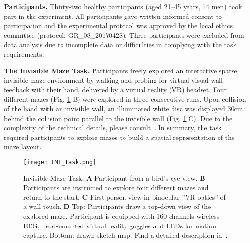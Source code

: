 
\indent \textbf{Participants.} Thirty-two healthy participants (aged 21--45 years, 14 men) took part in the
experiment. All participants gave written informed consent to participation and the experimental protocol was approved by the local ethics committee (protocol: GR\_08\_20170428). Three participants were excluded from data analysis due to incomplete data or difficulties in complying with the task requirements.

\indent \textbf{The Invisible Maze Task.} Participants freely explored an interactive sparse invisible maze environment by walking and probing for virtual visual wall feedback with their hand, delivered by a virtual reality (VR) headset. Four different mazes (Fig. \ref{imt_task} B) were explored in three consecutive runs. Upon collision of the hand with an invisible wall, an illuminated white disc was displayed 30cm behind the collision point parallel to the invisible wall (Fig. \ref{imt_task} C). Due to the complexity of the technical details, please consult~\cite{gehrke2018}. In summary, the task required participants to explore mazes to build a spatial representation of the maze layout.%

\begin{figure}[h]
\centering
\texttt{[image: IMT\_Task.png]}
\vspace{0pt}
\caption{Invisible Maze Task, \textbf{A} Participant from a bird’s eye view. \textbf{B} Participants are instructed to explore four different mazes and return to the start. \textbf{C} First-person view in binocular ''VR optics'' of a wall touch. \textbf{D} Top: Participants draw a top-down view of the explored maze. Participant is equipped with 160 channels wireless EEG, head-mounted virtual reality goggles and LEDs for motion capture. Bottom: drawn sketch map. Find a detailed description in~\cite{gehrke2018}.}
\label{imt_task}
\end{figure}